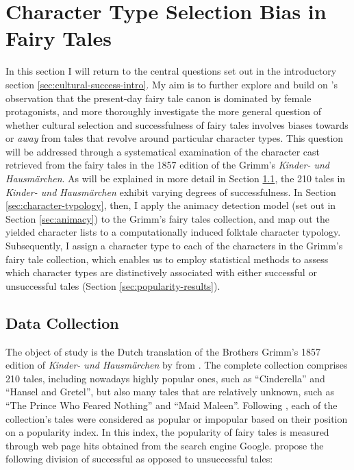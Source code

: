 \section{Character Type Selection Bias in Fairy Tales}\label{sec:grimmpopularity}

In this section I will return to the central questions set out in the introductory section \ref{sec:cultural-success-intro}. My aim is to further explore and build on \citeauthor{joosen:2014}'s observation that the present-day fairy tale canon is dominated by female protagonists\autocite{joosen:2014}, and more thoroughly investigate the more general question of whether cultural selection and successfulness of fairy tales involves biases towards or \emph{away} from tales that revolve around particular character types. This question will be addressed through a systematical examination of the character cast retrieved from the fairy tales in the 1857 edition of the Grimm's \emph{Kinder- und Hausmärchen}. As will be explained in more detail in Section \ref{sec:grimm-collection}, the 210 tales in \emph{Kinder- und Hausmärchen} exhibit varying degrees of successfulness. In Section \ref{sec:character-typology}, then, I apply the animacy detection model (set out in Section \ref{sec:animacy}) to the Grimm's fairy tales collection, and map out the yielded character lists to a computationally induced folktale character typology. Subsequently, I assign a character type to each of the characters in the Grimm's fairy tale collection, which enables us to employ statistical methods to assess which character types are distinctively associated with either successful or unsuccessful tales (Section \ref{sec:popularity-results}).

\subsection{Data Collection}\label{sec:grimm-collection}

The object of study is the Dutch translation of the Brothers Grimm's 1857 edition of \emph{Kinder- und Hausmärchen} by \citeauthor{Vries-Vogel:1984} from \citeyear{Vries-Vogel:1984}.\autocite{Vries-Vogel:1984} The complete collection comprises 210 tales, including nowadays highly popular ones, such as ``Cinderella'' and ``Hansel and Gretel'', but also many tales that are relatively unknown, such as ``The Prince Who Feared Nothing'' and ``Maid Maleen''. Following \citeauthor{Norenzayan:2006}, each of the collection's tales were considered as popular or impopular based on their position on a popularity index.\autocite{Norenzayan:2006} In this index, the popularity of fairy tales is measured through web page hits obtained from the search engine Google. \citeauthor{Norenzayan:2006} propose the following division of successful as opposed to unsuccessful tales:

